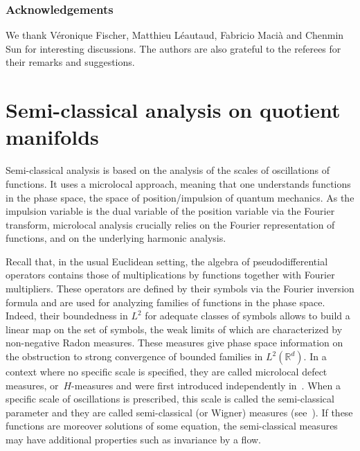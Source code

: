 \documentclass[JEP,XML,SOM,Unicode,published]{cedram}
\theoremstyle{plain}
\theoremstyle{definition}
\def\R{{\mathbb R}}
\begin{document}
\subsubsection*{Acknowledgements}
We thank Véronique Fischer, Matthieu Léautaud, Fabricio Macià and Chenmin Sun for interesting discussions. The authors are also grateful to the referees for their remarks and suggestions.

\section{Semi-classical analysis on quotient manifolds}\label{sec:semiclas}

Semi-classical analysis is based on the analysis of the scales of oscillations of functions. It uses a microlocal approach, meaning that one understands functions in the phase space, \ie the space of position/impulsion of quantum mechanics.
As the impulsion variable is the dual variable of the position variable via the Fourier transform, microlocal analysis crucially relies on the Fourier representation of functions, and on the underlying harmonic analysis.

Recall that, in the usual Euclidean setting, the algebra of pseudodifferential operators contains those of multiplications by functions together with Fourier multipliers. These operators are defined by their symbols via the Fourier inversion formula and are used for analyzing families of functions in the phase space. Indeed, their boundedness in $L^2$ for adequate classes of symbols allows to build a linear map on the set of symbols, the weak limits of which are characterized by non-negative Radon measures. These measures give phase space information on the obstruction to strong convergence of bounded families in $L^2(\R^d)$. In a context where no specific scale is specified, they are called microlocal defect measures, or~$H$-measures and were first introduced independently in~\cite{gerard_91,tartar}. When a specific scale of oscillations is prescribed, this scale is called the semi-classical parameter and they are called semi-classical (or Wigner) measures (see~\cite{HMR,gerard_X,gerardleichtnam,LP93,GMMP}).
If these functions are moreover solutions of some equation, the semi-classical measures may have additional properties such as invariance by a flow.
\end{document}
